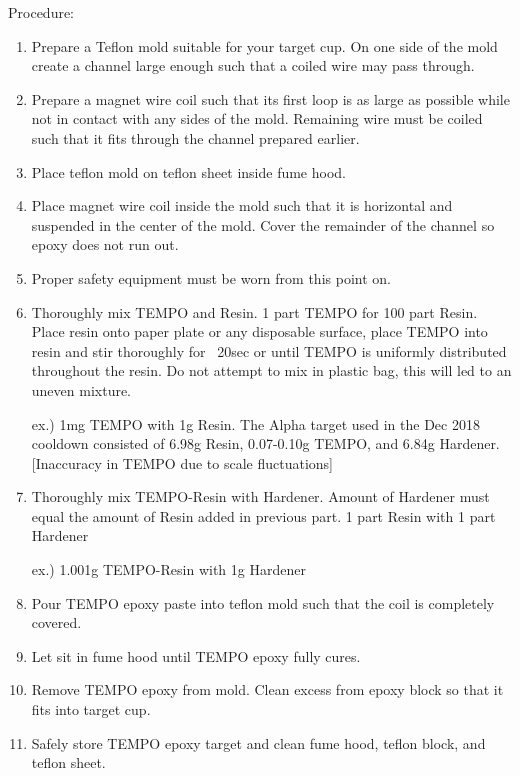 \documentclass[12pt,epsfig]{article}
\begin{document}
Procedure:
\begin{enumerate}
\item Prepare a Teflon mold suitable for your target cup. On one side of the mold create a channel large enough such that a coiled wire may pass through. 
\item Prepare a magnet wire coil such that its first loop is as large as possible while not in contact with any sides of the mold. Remaining wire must be coiled such that it fits through the channel prepared earlier.
\item Place teflon mold on teflon sheet inside fume hood. 
\item Place magnet wire coil inside the mold such that it is horizontal and suspended in the center of the mold. Cover the remainder of the channel so epoxy does not run out.  
\item Proper safety equipment must be worn from this point on. 
\item Thoroughly mix TEMPO and Resin. 1 part TEMPO for 100 part Resin. Place resin onto paper plate or any disposable surface, place TEMPO into resin and stir thoroughly for ~20sec or until TEMPO is uniformly distributed throughout the resin. Do not attempt to mix in plastic bag, this will led to an uneven mixture.    

ex.) 1mg TEMPO with 1g Resin. The Alpha target used in the Dec 2018 cooldown consisted of 6.98g Resin, 0.07-0.10g TEMPO, and 6.84g Hardener. [Inaccuracy in TEMPO due to scale fluctuations] 

\item Thoroughly mix TEMPO-Resin with Hardener. Amount of Hardener must equal the amount of Resin added in previous part. 1 part Resin with 1 part Hardener 

ex.) 1.001g TEMPO-Resin with 1g Hardener 
\item Pour TEMPO epoxy paste into teflon mold such that the coil is completely covered.
\item Let sit in fume hood until TEMPO epoxy fully cures. 
\item Remove TEMPO epoxy from mold. Clean excess from epoxy block so that it fits into target cup.
\item Safely store TEMPO epoxy target and clean fume hood, teflon block, and teflon sheet.
\end{enumerate}
\end{document}
